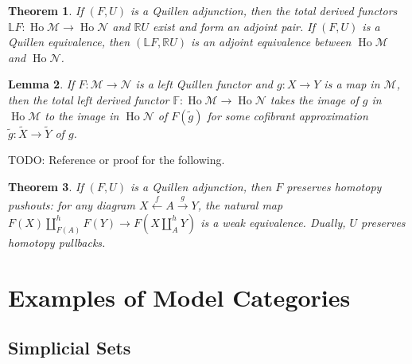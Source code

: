 \documentclass{scrartcl}
\theoremstyle{plain}
\newtheorem{theorem}{Theorem}[section]
\newtheorem{lemma}[theorem]{Lemma}
\theoremstyle{definition}
\newtheorem{example}[theorem]{Example}
\newcommand{\cat}[1]{\mathcal{#1}}
\let\xto\xrightarrow
\let\xfrom\xleftarrow
\renewcommand{\coprod}{\mathbin{\amalg}}
\DeclareMathOperator{\Ho}{Ho}
\begin{document}
\begin{theorem}
    If $(F, U)$ is a Quillen adjunction, then the total derived functors $\mathds LF\colon \Ho \cat M\to \Ho\cat N$ and $\mathds R U$ exist and form an adjoint pair. If $(F, U)$ is a Quillen equivalence, then $(\mathds LF,\mathds RU)$ is an adjoint equivalence between $\Ho\cat M$ and $\Ho\cat N$.
\end{theorem}

\begin{lemma}
    If $F\colon \cat M\to \cat N$ is a left Quillen functor and $g\colon X\to Y$ is a map in $\cat M$, then the total left derived functor $\mathds F\colon\Ho\cat M\to\Ho\cat N$ takes the image of $g$ in $\Ho\cat M$ to the image in $\Ho\cat N$ of $F(\tilde g)$ for some cofibrant approximation $\tilde g\colon\tilde X\to\tilde Y$ of $g$.
\end{lemma}



TODO: Reference or proof for the following.
\begin{theorem}
    If $(F, U)$ is a Quillen adjunction, then $F$ preserves homotopy pushouts: for any diagram $X\xfrom{f} A \xto{g} Y$, the natural map $F(X)\coprod^h_{F(A)} F(Y) \to F(X\coprod^h_A Y)$ is a weak equivalence. Dually, $U$ preserves homotopy pullbacks.
\end{theorem}

\section{Examples of Model Categories}
\subsection{Simplicial Sets}
\end{document}
